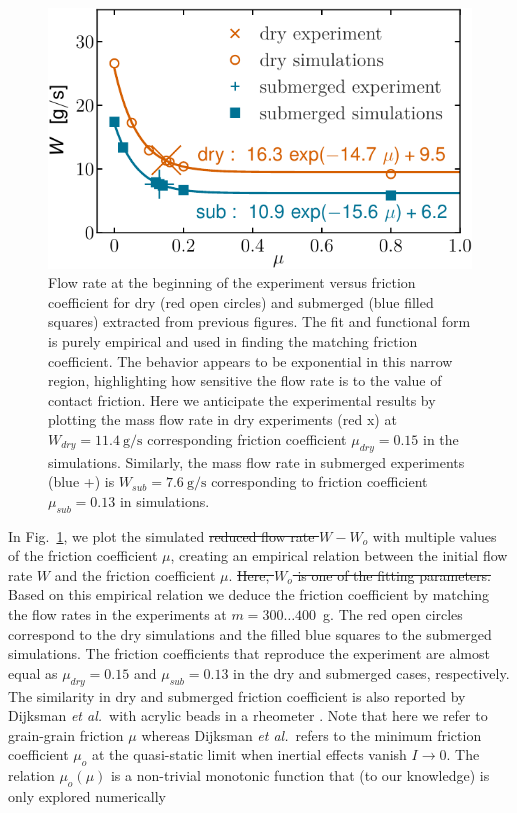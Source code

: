 \documentclass[twoside,twocolumn,9pt]{article}
\providecommand{\DIFadd}[1]{{\protect\color{blue}\uwave{#1}}} %
\providecommand{\DIFdel}[1]{{\protect\color{red}\sout{#1}}}                      %
\providecommand{\DIFaddbegin}{} %
\providecommand{\DIFaddend}{} %
\providecommand{\DIFdelbegin}{} %
\providecommand{\DIFdelend}{} %
\newcommand{\DIFscaledelfig}{0.5}
\newlength{\DIFdelgraphicswidth} %
\newlength{\DIFdelgraphicsheight} %
\newcommand{\DIFaddincludegraphics}[2][]{{\color{blue}\fbox{\DIFOincludegraphics[#1]{#2}}}} %
\newcommand{\DIFdelincludegraphics}[2][]{%
\sbox{\DIFdelgraphicsbox}{\DIFOincludegraphics[#1]{#2}}%
\settoboxwidth{\DIFdelgraphicswidth}{\DIFdelgraphicsbox} %
\settoboxtotalheight{\DIFdelgraphicsheight}{\DIFdelgraphicsbox} %
\scalebox{\DIFscaledelfig}{%
\parbox[b]{\DIFdelgraphicswidth}{\usebox{\DIFdelgraphicsbox}\\[-\baselineskip] \rule{\DIFdelgraphicswidth}{0em}}\llap{\resizebox{\DIFdelgraphicswidth}{\DIFdelgraphicsheight}{%
\setlength{\unitlength}{\DIFdelgraphicswidth}%
\begin{picture}(1,1)%
\thicklines\linethickness{2pt} %
{\color[rgb]{1,0,0}\put(0,0){\framebox(1,1){}}}%
{\color[rgb]{1,0,0}\put(0,0){\line( 1,1){1}}}%
{\color[rgb]{1,0,0}\put(0,1){\line(1,-1){1}}}%
\end{picture}%
}\hspace*{3pt}}} %
} %
\DeclareRobustCommand{\DIFaddbegin}{\DIFOaddbegin \let\includegraphics\DIFaddincludegraphics} %
\DeclareRobustCommand{\DIFaddend}{\DIFOaddend \let\includegraphics\DIFOincludegraphics} %
\DeclareRobustCommand{\DIFdelbegin}{\DIFOdelbegin \let\includegraphics\DIFdelincludegraphics} %
\DeclareRobustCommand{\DIFdelend}{\DIFOaddend \let\includegraphics\DIFOincludegraphics} %
\begin{document}
\DIFdelend \DIFaddbegin \begin{figure}[!t]
\includegraphics[width=\columnwidth]{fig7-wwo_vs_mu.pdf}
\caption{Flow rate at the beginning of the experiment versus friction coefficient for dry (red open circles) and submerged (blue filled squares) extracted from previous figures. The fit and functional form is purely empirical and used in finding the matching friction coefficient. The behavior appears to be exponential in this narrow region, highlighting how sensitive the flow rate is to the value of contact friction. Here we anticipate the experimental results by plotting the mass flow rate in dry experiments (red x) at $W_{dry} = 11.4~\mathrm{g/s}$ corresponding friction coefficient $\mu_{dry}=0.15$ in the simulations. Similarly, the mass flow rate in submerged experiments (blue +) is $W_{sub}=7.6~\mathrm{g/s}$ corresponding to friction coefficient $\mu_{sub} = 0.13$ in simulations.}\label{fig:q_vs_mu}
\end{figure}
\DIFaddend %
\DIFaddbegin {\DIFaddend In Fig.~\ref{fig:q_vs_mu}, we plot the simulated \DIFdelbegin \DIFdel{reduced flow rate $W-W_o$ }\DIFdelend \DIFaddbegin \DIFadd{flow rate $W$ }\DIFaddend with multiple values of the friction coefficient $\mu$, creating an empirical relation between the initial flow rate $W$ and the friction coefficient $\mu$. \DIFdelbegin \DIFdel{Here, $W_o$ is one of the fitting parameters. }\DIFdelend Based on this empirical relation we deduce the friction coefficient by matching the flow rates in the experiments at $m=300\ldots 400$~g. The red open circles correspond to the dry simulations  and the filled blue squares to the submerged simulations. The friction coefficients that reproduce the experiment are almost equal as $\mu_{dry}=0.15$ and $\mu_{sub}=0.13$ in the dry and submerged cases, respectively. The similarity in dry and submerged friction coefficient is also reported by Dijksman {\it et al.}~with acrylic beads in a rheometer \cite{DijksmanPRE10}. Note that here we refer to grain-grain friction \DIFdelbegin \DIFdel{$\mu$ }\DIFdelend whereas Dijksman {\it et al.}~refers to the  minimum friction coefficient $\mu_o$ at the quasi-static limit when inertial effects vanish $I\to 0$. The relation $\mu_o(\mu)$ is a non-trivial monotonic function that (to our knowledge) is only explored numerically \cite{Lemaitre09RHA,DaCruz05PRE,Trulsson16PRE}\DIFaddbegin \DIFadd{.}} \DIFaddend %
\end{document}
